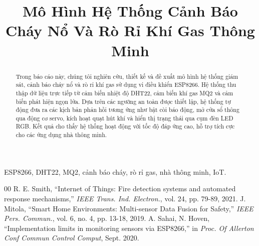 \documentclass[10pt, conference, a4paper]{IEEEtran}
\begin{document}
\title{Mô Hình Hệ Thống Cảnh Báo Cháy Nổ Và Rò Rỉ Khí Gas Thông Minh}

\author{
}

\maketitle

\begin{abstract}
Trong báo cáo này, chúng tôi nghiên cứu, thiết kế và đề xuất mô hình hệ thống giám sát, cảnh báo cháy nổ và rò rỉ khí gas sử dụng vi điều khiển ESP8266. Hệ thống thu thập dữ liệu trực tiếp từ cảm biến nhiệt độ DHT22, cảm biến khí gas MQ2 và cảm biến phát hiện ngọn lửa. Dựa trên các ngưỡng an toàn được thiết lập, hệ thống tự động đưa ra các kịch bản phản hồi tương ứng như bật còi báo động, mở cửa sổ thông qua động cơ servo, kích hoạt quạt hút khí và hiển thị trạng thái qua cụm đèn LED RGB. Kết quả cho thấy hệ thống hoạt động với tốc độ đáp ứng cao, hỗ trợ tích cực cho các ứng dụng nhà thông minh.
\end{abstract}

\begin{IEEEkeywords}
ESP8266, DHT22, MQ2, cảnh báo cháy, rò rỉ gas, nhà thông minh, IoT.
\end{IEEEkeywords}






\begin{thebibliography}{00}
 R. E. Smith, ``Internet of Things: Fire detection systems and automated response mechanisms,'' \emph{IEEE Trans. Ind. Electron.}, vol. 24, pp. 79-89, 2021.
 J. Mitola, ``Smart Home Environments: Multi-sensor Data Fusion for Safety,'' \emph{IEEE Pers. Commun.}, vol. 6, no. 4, pp. 13-18, 2019.
 A. Sahai, N. Hoven, ``Implementation limits in monitoring sensors via ESP8266,'' in \emph{Proc. Of Allerton Conf Commun Control Comput}, Sept. 2020.
\end{thebibliography}
\end{document}

